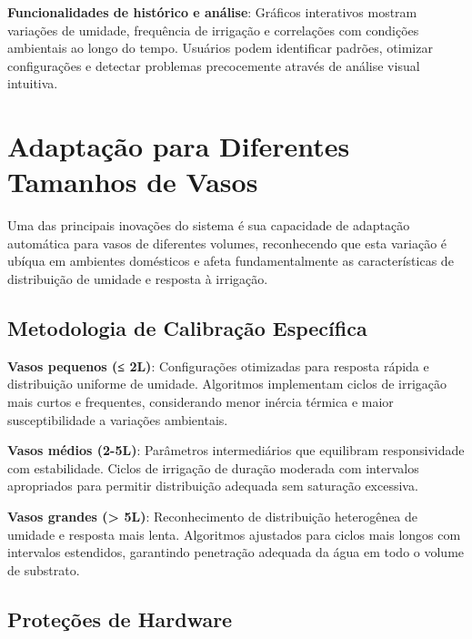 \documentclass[twoside,english,brazilian]{UNISINOSmonografia}
\begin{document}
\textbf{Funcionalidades de histórico e análise}: Gráficos interativos mostram variações de umidade, frequência de irrigação e correlações com condições ambientais ao longo do tempo. Usuários podem identificar padrões, otimizar configurações e detectar problemas precocemente através de análise visual intuitiva.

\section{Adaptação para Diferentes Tamanhos de Vasos}

Uma das principais inovações do sistema é sua capacidade de adaptação automática para vasos de diferentes volumes, reconhecendo que esta variação é ubíqua em ambientes domésticos e afeta fundamentalmente as características de distribuição de umidade e resposta à irrigação.

\subsection{Metodologia de Calibração Específica}

\textbf{Vasos pequenos (≤ 2L)}: Configurações otimizadas para resposta rápida e distribuição uniforme de umidade. Algoritmos implementam ciclos de irrigação mais curtos e frequentes, considerando menor inércia térmica e maior susceptibilidade a variações ambientais.

\textbf{Vasos médios (2-5L)}: Parâmetros intermediários que equilibram responsividade com estabilidade. Ciclos de irrigação de duração moderada com intervalos apropriados para permitir distribuição adequada sem saturação excessiva.

\textbf{Vasos grandes (> 5L)}: Reconhecimento de distribuição heterogênea de umidade e resposta mais lenta. Algoritmos ajustados para ciclos mais longos com intervalos estendidos, garantindo penetração adequada da água em todo o volume de substrato.


\subsection{Proteções de Hardware}
\end{document}
